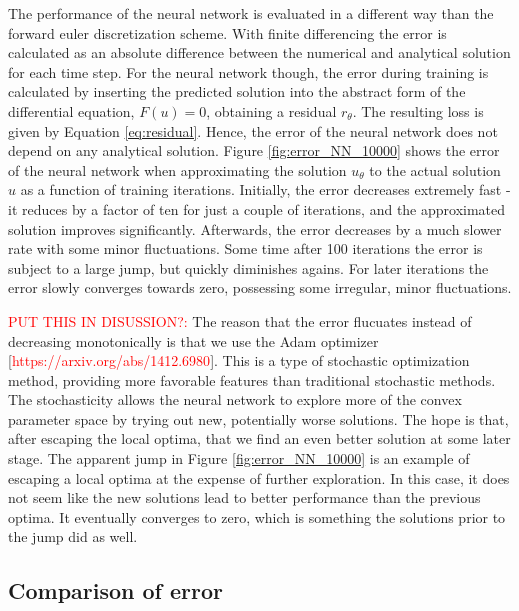 \documentclass[12pt]{extarticle}
\begin{document}
The performance of the neural network is evaluated in a different way than the forward euler discretization scheme. With finite differencing the error is calculated as an absolute difference between the numerical and analytical solution for each time step. For the neural network though, the error during training is calculated by inserting the predicted solution into the abstract form of the differential equation, $F(u)=0$, obtaining a residual $r_{\theta}$. The resulting loss is given by Equation \ref{eq:residual}. Hence, the error of the neural network does not depend on any analytical solution. Figure \ref{fig:error_NN_10000} shows the error of the neural network when approximating the solution $u_{\theta}$ to the actual solution $u$ as a function of training iterations. Initially, the error decreases extremely fast - it reduces by a factor of ten for just a couple of iterations, and the approximated solution improves significantly. Afterwards, the error decreases by a much slower rate with some minor fluctuations. Some time after 100 iterations the error is subject to a large jump, but quickly diminishes agains. For later iterations the error slowly converges towards zero, possessing some irregular, minor fluctuations. 
\par \textcolor{red}{PUT THIS IN DISUSSION?:} The reason that the error flucuates instead of decreasing monotonically is that we use the Adam optimizer [\textcolor{red}{https://arxiv.org/abs/1412.6980}]. This is a type of stochastic optimization method, providing more favorable features than traditional stochastic methods. The stochasticity allows the neural network to explore more of the convex parameter space by trying out new, potentially worse solutions. The hope is that, after escaping the local optima, that we find an even better solution at some later stage. The apparent jump in Figure \ref{fig:error_NN_10000} is an example of escaping a local optima at the expense of further exploration. In this case, it does not seem like the new solutions lead to better performance than the previous optima. It eventually converges to zero, which is something the solutions prior to the jump did as well. 

\subsection*{Comparison of error}
\end{document}
